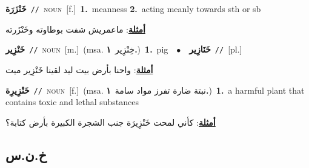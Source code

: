 \documentclass[10pt,a4paper,twoside]{article} %
\begin{document}
\begin{multicols}{2}
{\setlength\topsep{0pt}\textbf{\foreignlanguage{arabic}{خَنْزَرَة}}\ {\color{gray}\texttt{//}\color{black}}\ \textsc{noun}\ [f.]\ \textbf{1.}~meanness  \textbf{2.}~acting meanly towards sth or sb\  \begin{flushright}\color{gray}\foreignlanguage{arabic}{\textbf{\underline{\foreignlanguage{arabic}{أمثلة}}}: ماعمريش شفت بوطاوته وخَنْزَرته}\end{flushright}\color{black}} \vspace{2mm}

{\setlength\topsep{0pt}\textbf{\foreignlanguage{arabic}{خَنْزِير}}\ {\color{gray}\texttt{//}\color{black}}\ \textsc{noun}\ [m.]\ \color{gray}(msa. \foreignlanguage{arabic}{خِنْزِير}~\foreignlanguage{arabic}{\textbf{١.}})\color{black}\ \textbf{1.}~pig\ \ $\bullet$\ \ \setlength\topsep{0pt}\textbf{\foreignlanguage{arabic}{خَنَازِير}}\ {\color{gray}\texttt{//}\color{black}}\ [pl.]\  \begin{flushright}\color{gray}\foreignlanguage{arabic}{\textbf{\underline{\foreignlanguage{arabic}{أمثلة}}}: واحنا بأرض بيت ليد لقينا خَنْزِير ميت}\end{flushright}\color{black}} \vspace{2mm}

{\setlength\topsep{0pt}\textbf{\foreignlanguage{arabic}{خَنْزِيرِة}}\ {\color{gray}\texttt{//}\color{black}}\ \textsc{noun}\ [f.]\ \color{gray}(msa. \foreignlanguage{arabic}{نبتة ضارة تفرز مواد سامة}~\foreignlanguage{arabic}{\textbf{١.}})\color{black}\ \textbf{1.}~a harmful plant that contains toxic and lethal substances\  \begin{flushright}\color{gray}\foreignlanguage{arabic}{\textbf{\underline{\foreignlanguage{arabic}{أمثلة}}}: كأني لمحت خَنْزِيرَة جنب الشجرة الكبيرة بأرض كتابة؟}\end{flushright}\color{black}} \vspace{2mm}

\vspace{-3mm}
\subsection*{\color{blue}\foreignlanguage{arabic}{خ.ن.س}\color{blue}{}} 


\end{multicols}
\end{document}
